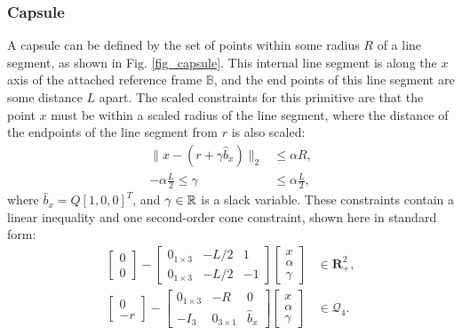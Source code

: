 \subsubsection{Capsule}
A capsule can be defined by the set of points within some radius $R$ of a line segment, as shown in Fig. \ref{fig_capsule}.  This internal line segment is along the $x$ axis of the attached reference frame $\mathbb{B}$, and the end points of this line segment are some distance $L$ apart. The scaled constraints for this primitive are that the point $x$ must be within a scaled radius of the line segment, where the distance of the endpoints of the line segment from $r$ is also scaled: 
\begin{align}
    \| x - (r + \gamma \hat{b}_x) \|_2 &\leq \alpha R, \label{cyl_con_1}\\ 
    -\alpha \frac{L}{2} \leq \gamma &\leq \alpha \frac{L}{2},\label{cyl_con_2}
\end{align}
where $\hat{b}_x = Q [1,0,0]^T$, and $\gamma \in \mathbb{R}{}$ is a slack variable.  These constraints contain a linear inequality and one second-order cone constraint, shown here in standard form:
\begin{align}
    \begin{bmatrix} 0 \\ 0 \end{bmatrix} - \begin{bmatrix} 0_{1 \times 3} & -L/2 & 1 \\ 0_{1 \times 3} & -L/2 & -1 \end{bmatrix} \begin{bmatrix} x \\ \alpha \\ \gamma \end{bmatrix} &\in \mathbf{R}_+^2, \label{eq:std_caps1}\\ 
    \begin{bmatrix}0 \\ -r  \end{bmatrix}  - \begin{bmatrix} 0_{1 \times 3} & -R & 0 \\ -I_3 & 0_{3 \times 1} & \hat{b}_x  \end{bmatrix} \begin{bmatrix} x \\ \alpha \\ \gamma \end{bmatrix} &\in \mathcal{Q}_4. \label{eq:std_caps2}
\end{align}
